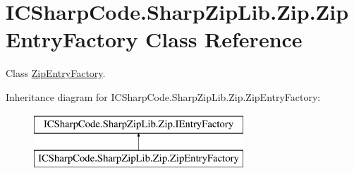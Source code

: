 \hypertarget{class_i_c_sharp_code_1_1_sharp_zip_lib_1_1_zip_1_1_zip_entry_factory}{}\section{I\+C\+Sharp\+Code.\+Sharp\+Zip\+Lib.\+Zip.\+Zip\+Entry\+Factory Class Reference}
\label{class_i_c_sharp_code_1_1_sharp_zip_lib_1_1_zip_1_1_zip_entry_factory}


Class \hyperlink{class_i_c_sharp_code_1_1_sharp_zip_lib_1_1_zip_1_1_zip_entry_factory}{Zip\+Entry\+Factory}.  


Inheritance diagram for I\+C\+Sharp\+Code.\+Sharp\+Zip\+Lib.\+Zip.\+Zip\+Entry\+Factory\+:\begin{figure}[H]
\begin{center}
\leavevmode
\includegraphics[height=2.000000cm]{class_i_c_sharp_code_1_1_sharp_zip_lib_1_1_zip_1_1_zip_entry_factory}
\end{center}
\end{figure}
